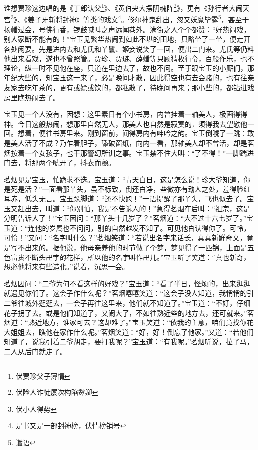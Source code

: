 \documentclass[12pt,oneside]{book}
\begin{document}
谁想贾珍这边唱的是《丁郎认父\footnote{伏贾珍父子薄情}》、《黄伯央大摆阴魂阵\footnote{伏险人诈徒屡次构陷颦卿}》，更有《孙行者大闹天宫\footnote{伏小人得势}》、《姜子牙斩将封神》等类的戏文\footnote{是书又是一部封神榜，伏情榜销号}。倏尔神鬼乱出，忽又妖魔毕露\footnote{谶语}，甚至于扬幡过会，号佛行香，锣鼓喊叫之声远闻巷外。满街之人个个都赞：“好热闹戏，别人家断不能有的！”宝玉见繁华热闹到如此不堪的田地，只略坐了一坐，便走开各处闲耍。先是进内去和尤氏和丫鬟、姬妾说笑了一回，便出二门来。尤氏等仍料他出来看戏，遂也不曾照管。贾珍、贾琏、薛蟠等只顾猜枚行令，百般作乐，也不理论，纵一时不见他在座，只道在里边去了，故也不问。至于跟宝玉的小厮们，那年纪大些的，知宝玉这一来了，必是晚间才散，因此得空也有去会赌的，也有往亲友家去吃年茶的，更有或嫖或饮的，都私散了，待晚间再来；那小些的，都钻进戏房里瞧热闹去了。

宝玉见一个人没有，因想：这里素日有个小书房，内曾挂着一轴美人，极画得得神。今日这般热闹，想那里自然无人，那美人也自然是寂寞的，须得我去望慰他一回。想着，便往书房里来。刚到窗前，闻得房内有呻吟之韵。宝玉倒唬了一跳：敢是美人活了不成？乃乍着胆子，舔破窗纸，向内一看，那轴美人却不曾活，却是茗烟按着一个女孩子，也干那警幻所训之事。宝玉禁不住大叫：“了不得！”一脚踹进门去，将那两个唬开了，抖衣而颤。

茗烟见是宝玉，忙跪求不迭。宝玉道：“青天白日，这是怎么说！珍大爷知道，你是死是活？”一面看那丫头，虽不标致，倒还白净，些微亦有动人之处，羞得脸红耳赤，低头无言。宝玉跺脚道：“还不快跑！”一语提醒了那丫头，飞也似去了。宝玉又赶出去，叫道：“你别怕，我是不告诉人的！”急得茗烟在后叫：“祖宗，这是分明告诉人了！”宝玉因问：“那丫头十几岁了？”茗烟道：“大不过十六七岁了。”宝玉道：“连他的岁属也不问问，别的自然越发不知了。可见他白认得你了。可怜，可怜！”又问：“名字叫什么？”茗烟笑道：“若说出名字来话长，真真新鲜奇文，竟是写不出来的。据他说，他母亲养他的时节做了个梦，梦见得了一匹锦，上面是五色富贵不断头卍字的花样，所以他的名字叫作卍儿。”宝玉听了笑道：“真也新奇，想必他将来有些造化。”说着，沉思一会。

茗烟因问：“二爷为何不看这样的好戏？”宝玉道：“看了半日，怪烦的，出来逛逛就遇见你们了。这会子作什么呢？”茗烟嘻嘻笑道：“这会子没人知道，我悄悄的引二爷往城外逛逛去，一会子再往这里来，他们就不知道了。”宝玉道：“不好，仔细花子拐了去。或是他们知道了，又闹大了，不如往熟近些的地方去，还可就来。”茗烟道：“熟近地方，谁家可去？这却难了。”宝玉笑道：“依我的主意，咱们竟找你花大姐姐去，瞧他在家作什么呢。”茗烟笑道：“好，好！倒忘了他家。”又道：“若他们知道了，说我引着二爷胡走，要打我呢？”宝玉道：“有我呢。”茗烟听说，拉了马，二人从后门就走了。
\end{document}
